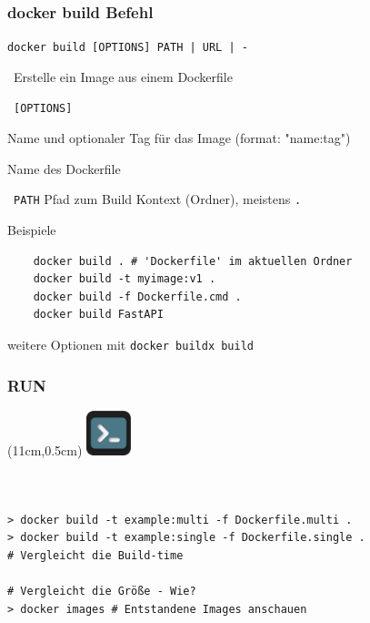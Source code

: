 \documentclass[22pt]{beamer}
\newcommand{\code}[1]{\colorbox{darkgray!20}{\texttt{#1}}}
\newcommand{\desclabel}[1]{\textcolor{cyan}{#1}}
\newcommand{\terminal}{
    \begin{textblock*}{1.3cm}(11cm,0.5cm) %
    \includegraphics[width=1.3cm]{Bilder/terminal2.png}
    \end{textblock*}
}
\begin{document}
\begin{frame}[fragile]
    \frametitle{docker build Befehl}
    \code{docker build [OPTIONS] PATH | URL | -} 
    
    \-  \ Erstelle ein Image aus einem Dockerfile\vspace{5pt}
    
    \-  \  \code{[OPTIONS]}
    \begin{description}[labelindent=0.5cm, style=unboxed, labelwidth=\widthof{-f, -\,-file string}, leftmargin=!]
        \item[\desclabel{-t, -\,-tag stringArray}] Name und optionaler Tag für das Image (format: "name:tag")
        \item[\desclabel{-f, -\,-file string}] Name des Dockerfile
        \item[...] 
    \end{description}
    
    \-  \ \code{PATH} Pfad zum Build Kontext (Ordner), meistens \code{.}
    \pause
    
    Beispiele
    \begin{verbatim}
    docker build . # 'Dockerfile' im aktuellen Ordner
    docker build -t myimage:v1 . 
    docker build -f Dockerfile.cmd . 
    docker build FastAPI
    \end{verbatim}
    \medskip

    {\small weitere Optionen mit \code{docker buildx build}}
\end{frame}

\begin{frame}[fragile, b]
    \frametitle{RUN}
    \terminal
    \begin{columns}
        \begin{column}{0.5\textwidth}
            \inputminted[fontsize=\scriptsize, frame=lines]{dockerfile}{../examples/Dockerfile.multi}
        \end{column}
        \begin{column}{0.5\textwidth}
            \inputminted[fontsize=\scriptsize, frame=lines]{dockerfile}{../examples/Dockerfile.single}
        \end{column}
    \end{columns}
    \medskip\pause
\begin{verbatim}
> docker build -t example:multi -f Dockerfile.multi .
> docker build -t example:single -f Dockerfile.single .
# Vergleicht die Build-time

# Vergleicht die Größe - Wie?
> docker images # Entstandene Images anschauen

\end{verbatim}
\end{frame}
\end{document}
